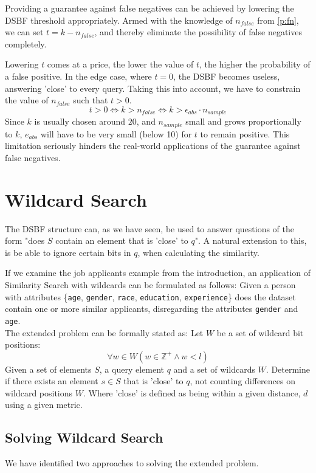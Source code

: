 \documentclass[a4paper,11pt]{article}
\begin{document}
Providing a guarantee against false negatives can be achieved by lowering the DSBF threshold appropriately. Armed with the knowledge of $n_{false}$ from \ref{p:fn}, we can set $t = k - n_{false}$, and thereby eliminate the possibility of false negatives completely.

Lowering $t$ comes at a price, the lower the value of $t$, the higher the probability of a false positive. In the edge case, where $t=0$, the DSBF becomes useless, answering 'close' to every query. Taking this into account, we have to constrain the value of $n_{false}$ such that $t>0$.
\[t > 0 \Leftrightarrow k > n_{false} \Leftrightarrow k > \epsilon_{abs} \cdot n_{sample}\]
Since $k$ is usually chosen around $20$, and $n_{sample}$ small and grows proportionally to $k$, $e_{abs}$ will have to be very small (below 10) for $t$ to remain positive. This limitation seriously hinders the real-world applications of the guarantee against false negatives.

\section{Wildcard Search}
The DSBF structure can, as we have seen, be used to answer questions of the form "does $S$ contain an element that is 'close' to $q$". A natural extension to this, is be able to ignore certain bits in $q$, when calculating the similarity.

If we examine the job applicants example from the introduction, an application of Similarity Search with wildcards can be formulated as follows: Given a person with attributes \{\texttt{age}, \texttt{gender}, \texttt{race}, \texttt{education}, \texttt{experience}\} does the dataset contain one or more similar applicants, disregarding the attributes \texttt{gender} and \texttt{age}.\\

The extended problem can be formally stated as: Let $W$ be a set of wildcard bit positions:
\[\forall w \in W (w \in \mathbb{Z}^+ \land w < l)\]
Given a set of elements $S$, a query element $q$ and a set of wildcards $W$. Determine if there exists an element $s \in S$ that is 'close' to $q$, not counting differences on wildcard positions $W$. Where 'close' is defined as being within a given distance, $d$ using a given metric.

\subsection{Solving Wildcard Search}
We have identified two approaches to solving the extended problem.
\end{document}
